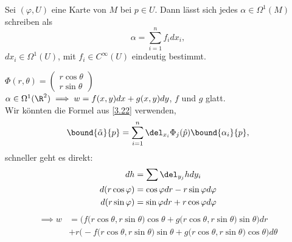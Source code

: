 \begin{lem}
	Sei $ (\varphi,U) $ eine Karte von $M$ bei $p \in U$. Dann lässt sich jedes $ \alpha \in \Omega^1(M) $ schreiben als
	\[ \alpha = \sum_{i=1}^n f_i d x_i, \]
	$dx_i \in \Omega^1(U)$, mit $f_i \in C^\infty(U)$ eindeutig bestimmt.
\end{lem}

\begin{exmp*}
	$ \Phi(r,\theta) = \begin{pmatrix}
		r\cos\theta\\ r \sin\theta
	\end{pmatrix} $\\
	$\alpha \in \Omega^1(\R^2) \implies w = f(x,y)dx + g(x,y)dy$, $f$ und $g$ glatt.\\
	Wir könnten die Formel aus \ref{3.22} verwenden,
	\[ \bound{\tilde{\alpha}}{p} = \sum_{i=1}^n \del_{x_i} \Phi_j (\hat{p}) \bound{\alpha_i}{p}, \]
	schneller geht es direkt:
	\begin{align*}
		dh &= \sum \del_{y_j}h dy_i\\
		d(r\cos\varphi) &= \cos\varphi dr - r \sin\varphi d\varphi\\
		d(r\sin\varphi) &= \sin\varphi dr + r \cos\varphi d\varphi
	\end{align*}
	\begin{align*}
		\implies w &= \Big(f \big(r\cos\theta,r\sin\theta \big)\cos\theta + g \big(r\cos\theta,r\sin\theta \big)\sin\theta\Big) dr\\
		&+ r\Big(-f \big(r\cos\theta,r\sin\theta \big)\sin\theta + g \big(r\cos\theta,r\sin\theta \big)\cos\theta\Big) d\theta
	\end{align*} 
\end{exmp*}